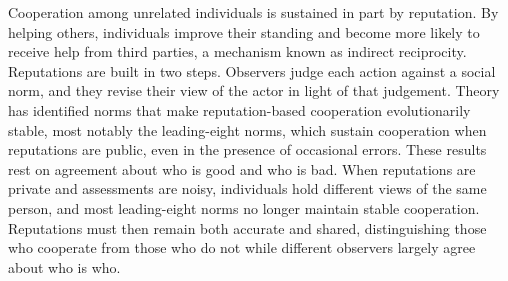 Cooperation among unrelated individuals is sustained in part by reputation\cite{milinski2016,nowak2005}. By helping others, individuals improve their standing and become more likely to receive help from third parties, a mechanism known as indirect reciprocity\cite{nowak1998,leimar2001,wedekind2000,milinski2002}. Reputations are built in two steps. Observers judge each action against a social norm, and they revise their view of the actor in light of that judgement\cite{ohtsuki2004,santos2018}. Theory has identified norms that make reputation-based cooperation evolutionarily stable\cite{panchanathan2003,ohtsuki2004}, most notably the leading-eight norms, which sustain cooperation when reputations are public, even in the presence of occasional errors\cite{ohtsuki2004,ohtsuki2006}. These results rest on agreement about who is good and who is bad. When reputations are private and assessments are noisy, individuals hold different views of the same person\cite{takahashi2006,uchida2010}, and most leading-eight norms no longer maintain stable cooperation\cite{hilbe2018,okada2018,perret2021,fujimoto2023}. Reputations must then remain both accurate and shared, distinguishing those who cooperate from those who do not while different observers largely agree about who is who\cite{fujimoto2022,murase2024synchronization}.
